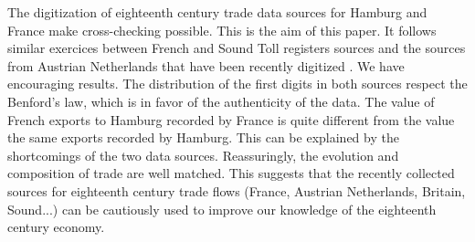 \documentclass[12pt,a4paper,titlepage,english]{article}
\begin{document}
The digitization of eighteenth century trade data sources for Hamburg and France make cross-checking possible. This is the aim of this paper. It follows similar exercices between French and Sound Toll registers sources \cite{charles_cross-checking_2018} and the sources from Austrian Netherlands that have been recently digitized \cite{charles_comparing_2016}. We have encouraging results.
The distribution of the first digits in both sources respect the Benford's law, which is in favor of the authenticity of the data.
The value of French exports to Hamburg recorded by France is quite different from the value the same exports recorded by Hamburg.
This can be explained by the shortcomings of the two data sources.
Reassuringly, the evolution and composition of trade are well matched.
This suggests that the recently collected sources for eighteenth century trade flows (France, Austrian Netherlands, Britain, Sound...) can be cautiously used to improve our knowledge of the eighteenth century economy.  

\end{document}
